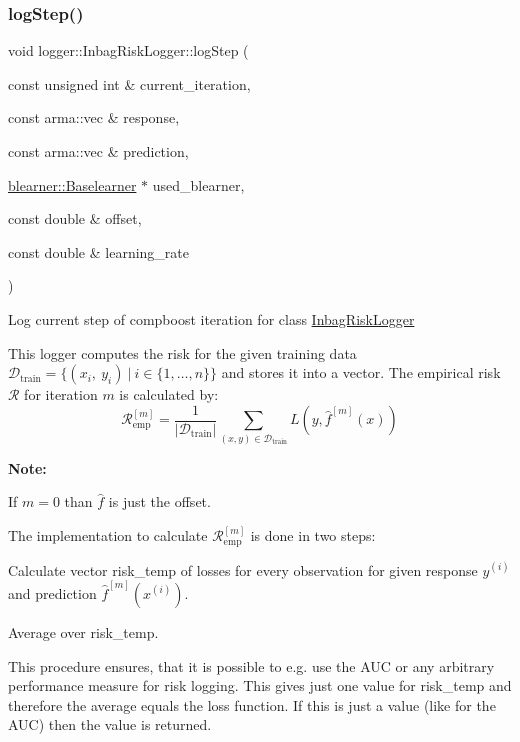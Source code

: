 \subsubsection{\texorpdfstring{log\+Step()}{logStep()}}
{\footnotesize\ttfamily void logger\+::\+Inbag\+Risk\+Logger\+::log\+Step (\begin{DoxyParamCaption}\item[{const unsigned int \&}]{current\+\_\+iteration,  }\item[{const arma\+::vec \&}]{response,  }\item[{const arma\+::vec \&}]{prediction,  }\item[{\mbox{\hyperlink{classblearner_1_1_baselearner}{blearner\+::\+Baselearner}} $\ast$}]{used\+\_\+blearner,  }\item[{const double \&}]{offset,  }\item[{const double \&}]{learning\+\_\+rate }\end{DoxyParamCaption})\hspace{0.3cm}{\ttfamily [virtual]}}



Log current step of compboost iteration for class {\ttfamily \mbox{\hyperlink{classlogger_1_1_inbag_risk_logger}{Inbag\+Risk\+Logger}}} 

This logger computes the risk for the given training data $\mathcal{D}_\mathrm{train} = \{(x_i,\ y_i)\ |\ i \in \{1, \dots, n\}\}$ and stores it into a vector. The empirical risk $\mathcal{R}$ for iteration $m$ is calculated by\+: \[ \mathcal{R}_\mathrm{emp}^{[m]} = \frac{1}{|\mathcal{D}_\mathrm{train}|}\sum\limits_{(x,y) \in \mathcal{D}_\mathrm{train}} L(y, \hat{f}^{[m]}(x)) \]

{\bfseries Note\+:}
\begin{DoxyItemize}
\item If $m=0$ than $\hat{f}$ is just the offset.
\item The implementation to calculate $\mathcal{R}_\mathrm{emp}^{[m]}$ is done in two steps\+:
\begin{DoxyEnumerate}
\item Calculate vector {\ttfamily risk\+\_\+temp} of losses for every observation for given response $y^{(i)}$ and prediction $\hat{f}^{[m]}(x^{(i)})$.
\item Average over {\ttfamily risk\+\_\+temp}.
\end{DoxyEnumerate}

This procedure ensures, that it is possible to e.\+g. use the A\+UC or any arbitrary performance measure for risk logging. This gives just one value for {\ttfamily risk\+\_\+temp} and therefore the average equals the loss function. If this is just a value (like for the A\+UC) then the value is returned.
\end{DoxyItemize}


